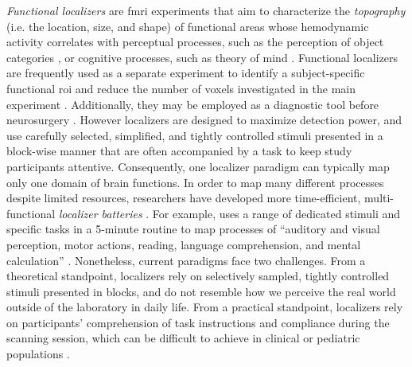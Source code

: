 

\textit{Functional localizers} \citep[s.][for reviews]{saxe2006divide,
friston2006critique} are \ac{fmri} experiments that aim to characterize the
\textit{topography} (i.e. the location, size, and shape) of functional areas
whose hemodynamic activity correlates with perceptual processes, such as the
perception of object categories \citep{kanwisher1997ffa}, or cognitive
processes, such as theory of mind \citep{spunt2014validating}.
Functional localizers are frequently used as a separate experiment to identify a
subject-specific functional \ac{roi} and reduce the number of voxels
investigated in the main experiment \citep{poldrack2007region, saxe2006divide}.
Additionally, they may be employed as a diagnostic tool before neurosurgery
\citep[cf.][]{silva2018challenges, szaflarski2017practice}.
However localizers are designed to maximize detection power, and use carefully
selected, simplified, and tightly controlled stimuli presented in a block-wise
manner that are often accompanied by a task to keep study participants
attentive.
Consequently, one localizer paradigm can typically map only one domain of brain
functions.
In order to map many different processes despite limited resources, researchers
have developed more time-efficient, multi-functional \textit{localizer
batteries} \citep[e.g.,][]{barch2013function, drobyshevsky2006rapid,
pinho2018individual, pinho2020individual, pinel2007fast}.
For example, \citet{pinel2007fast} uses a range of dedicated stimuli and
specific tasks in a 5-minute routine to map processes of ``auditory and visual
perception, motor actions, reading, language comprehension, and mental
calculation'' \citep[][p. 15]{pinel2007fast}.
Nonetheless, current paradigms face two challenges.
From a theoretical standpoint, localizers rely on selectively sampled, tightly
controlled stimuli presented in blocks, and do not resemble how we perceive the
real world outside of the laboratory in daily life.
From a practical standpoint, localizers rely on participants' comprehension of
task instructions and compliance during the scanning session, which can be
difficult to achieve in clinical or pediatric populations
\citep{eickhoff2020towards, vanderwal2015inscapes, vanderwal2019movies}.


